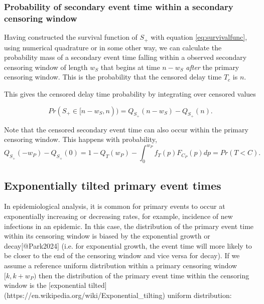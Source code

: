 \documentclass[10pt,letterpaper]{article}
\begin{document}



\subsubsection{Probability of secondary event time within a secondary censoring window}

Having constructed the survival function of $S_+$ with equation \ref{eq:survivalfunc}, using numerical quadrature or in some other way, we can calculate the probability mass of a secondary event time falling within a observed secondary censoring window of length $w_S$ that begins at time $n - w_S$ \textit{after} the primary censoring window. This is the probability that the censored delay time $T_c$ is $n$.

This gives the censored delay time probability by integrating over censored values

\begin{equation}
\label{eq:seccensorprob}
Pr(S_+ \in [n - w_S, n)) = Q_{S_+}(n-w_S) - Q_{S_+}(n).
\end{equation}


Note that the censored secondary event time can also occur within the primary censoring window. This happens with probability,
$$
Q_{S_+}(-w_P) - Q_{S_+}(0) = 1 - Q_T(w_P) - \int_0^{w_P} f_T(p) F_{C_P}(p) dp = Pr(T< C).
$$

\subsection{Exponentially tilted primary event times}
In epidemiological analysis, it is common for primary events to occur at exponentially increasing or decreasing rates, for example, incidence of new infections in an epidemic. In this case, the distribution of the primary event time within its censoring window is biased by the exponential growth or decay[@Park2024] (i.e. for exponential growth, the event time will more likely to be closer to the end of the censoring window and vice versa for decay). If we assume a reference uniform distribution within a primary censoring window $[k, k + w_P)$ then the distribution of the primary event time within the censoring window is the [exponential tilted](https://en.wikipedia.org/wiki/Exponential_tilting) uniform distribution:
\end{document}
